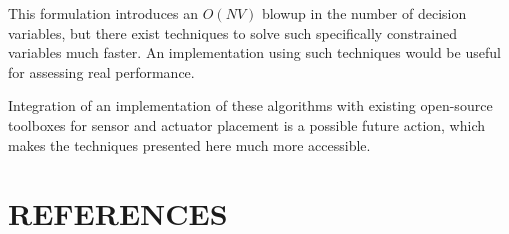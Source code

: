 \documentclass[authoryear,preprint,review,12pt]{elsarticle}
\begin{document}
This formulation introduces an $O(NV)$ blowup in the number of decision
variables, but there exist techniques to solve such specifically constrained
variables much faster. An implementation using such techniques would
be useful for assessing real performance.

Integration of an implementation of these algorithms with existing
open-source toolboxes for sensor and actuator placement is a possible
future action, which makes the techniques presented here much more
accessible.

\section{REFERENCES}


\end{document}
